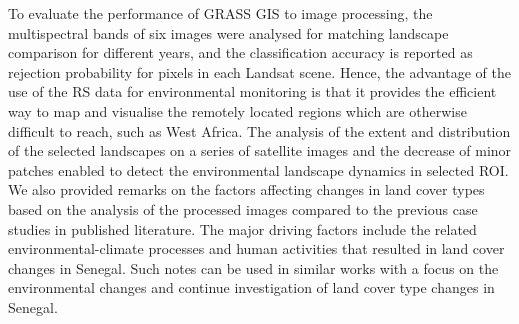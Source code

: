 \documentclass[earth,article,submit,pdftex,moreauthors]{Definitions/mdpi}
\begin{document}
{{To }evaluate the performance of GRASS GIS{ }to image processing, {the }{multispectral bands of six} images were analysed for matching{ }landscape comparison for different years{, }and the classification accuracy is reported as rejection probability for pixels in each Landsat scene. Hence, the advantage of the use of the {RS} data for environmental monitoring is that it provides the efficient way to map and visualise the remotely located regions which are otherwise difficult to reach, such as{ }West Africa. The analysis of the extent and distribution of the selected landscapes on a series of satellite images and the decrease of minor patches enabled to detect the environmental landscape dynamics in selected {ROI}. We also provided{ }remarks on the {factors affecting changes in} land cover types{ }based on the analysis of the processed images compared to the previous {case }studies {in} published literature. {The} major driving factors {include the} related environmental-climate processes {and human activities} that resulted in land cover changes in Senegal. Such notes can be used in{ }similar works {with a }focus on the environmental changes and continue investigation of land cover type changes in Senegal{.}







}
\end{document}
